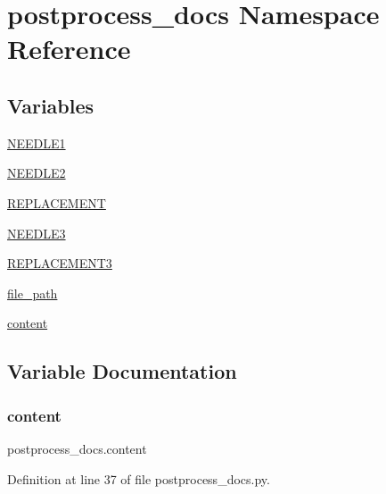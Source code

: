 \hypertarget{namespacepostprocess__docs}{}\section{postprocess\+\_\+docs Namespace Reference}
\label{namespacepostprocess__docs}
\subsection*{Variables}
\begin{DoxyCompactItemize}
\item 
\hyperlink{namespacepostprocess__docs_a2787bf0f9720ebc8ce2f982d509dee30}{N\+E\+E\+D\+L\+E1}
\item 
\hyperlink{namespacepostprocess__docs_a58140e60b570bd2becea8810dfc9eb11}{N\+E\+E\+D\+L\+E2}
\item 
\hyperlink{namespacepostprocess__docs_abc7d36fe9f9069aad2ab9f65d64c0a53}{R\+E\+P\+L\+A\+C\+E\+M\+E\+NT}
\item 
\hyperlink{namespacepostprocess__docs_aae55c6463df17cf2afec3851b48b4b4d}{N\+E\+E\+D\+L\+E3}
\item 
\hyperlink{namespacepostprocess__docs_a61159bfab5207c899b27b1faac0ac48a}{R\+E\+P\+L\+A\+C\+E\+M\+E\+N\+T3}
\item 
\hyperlink{namespacepostprocess__docs_a889f9a8eed613997e6e3ea9ae5035ab7}{file\+\_\+path}
\item 
\hyperlink{namespacepostprocess__docs_ae1bc6708d5bff1f8df885bf4edc54366}{content}
\end{DoxyCompactItemize}


\subsection{Variable Documentation}
\mbox{\label{namespacepostprocess__docs_ae1bc6708d5bff1f8df885bf4edc54366}} 
\subsubsection{\texorpdfstring{content}{content}}
{\footnotesize\ttfamily postprocess\+\_\+docs.\+content}



Definition at line 37 of file postprocess\+\_\+docs.\+py.

